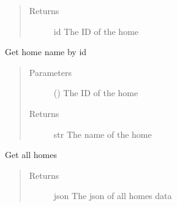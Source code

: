 \documentclass[letterpaper,10pt,english]{sphinxmanual}
\begin{document}
\begin{fulllineitems}
\begin{fulllineitems}
\begin{quote}
\begin{description}
\item[{Returns}] \leavevmode
\sphinxAtStartPar
id \textendash{} The ID of the home

\end{description}\end{quote}

\end{fulllineitems}


\begin{fulllineitems}
\label{\detokenize{index:Api.Api.get_home_name_by_id}}
\sphinxAtStartPar
Get home name by id
\begin{quote}\begin{description}
\item[{Parameters}] \leavevmode
\sphinxAtStartPar
{} () \textendash{} The ID of the home

\item[{Returns}] \leavevmode
\sphinxAtStartPar
str \textendash{} The name of the home

\end{description}\end{quote}

\end{fulllineitems}


\begin{fulllineitems}
\label{\detokenize{index:Api.Api.get_homes}}
\sphinxAtStartPar
Get all homes
\begin{quote}\begin{description}
\item[{Returns}] \leavevmode
\sphinxAtStartPar
json \textendash{} The json of all homes data

\end{description}\end{quote}

\end{fulllineitems}



\end{fulllineitems}
\end{document}
